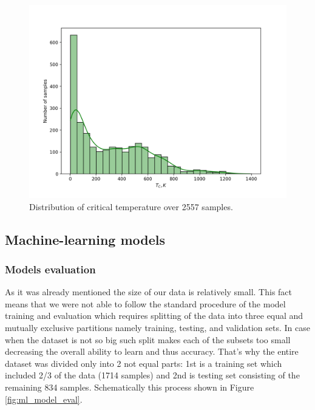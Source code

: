 \begin{figure}[H]
	\centering
	\includegraphics[width=160mm]{fig/ml_fig/tc_distrib.png}
	\caption[Critical temperature distribution histogram over 2557 samples]{Distribution of critical temperature over 2557 samples.}
\label{fig:tc_distrib}
\end{figure}

\subsection{Machine-learning models}

\subsubsection{Models evaluation}

As it was already mentioned the size of our data is relatively small. This fact means that we were not able to follow the standard procedure of the model training and evaluation which requires splitting of the data into three equal and mutually exclusive partitions namely training, testing, and validation sets. In case when the dataset is not so big such split makes each of the subsets too small decreasing the overall ability to learn and thus accuracy. That’s why the entire dataset was divided only into 2 not equal parts: 1st is a training set which included 2/3 of the data (1714 samples) and 2nd is testing set consisting of the remaining 834 samples. Schematically this process shown in Figure \ref{fig:ml_model_eval}.

